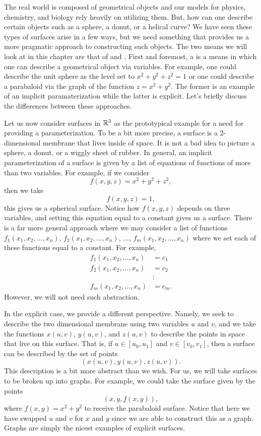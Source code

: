     The real world is composed of geometrical objects and our models for physics, chemistry, and biology rely heavily on utilizing them.  But, how can one describe certain objects such as a sphere, a donut, or a helical curve?  We have seen these types of surfaces arise in a few ways, but we need something that provides us a more pragmatic approach to constructing such objects. The two means we will look at in this chapter are that of  and . First and foremost, a  is a means in which one can describe a geometrical object via variables.  For example, one could describe the unit sphere as the level set to $x^2+y^2+z^2=1$ or one could describe a parabaloid via the graph of the function $z=x^2+y^2$. The former is an example of an implicit paramaterization while the latter is explicit. Let's briefly discuss the differences between these approaches.
    
    Let us now consider surfaces in $\mathbb{R}^3$ as the prototypical example for a need for providing a parameterization.  To be a bit more precise, a surface is a 2-dimensional membrane that lives inside of space.  It is not a bad idea to picture a sphere, a donut, or a wiggly sheet of rubber. In general, an implicit parameterization of a surface is given by a list of equations of functions of more than two variables.  For example, if we consider
    \[
    f(x,y,z) = x^2+y^2+z^2,
    \]
    then we take
    \[
    f(x,y,z) = 1,
    \]
    this gives us a spherical surface.  Notice how $f(x,y,z)$ depends on three variables, and setting this equation equal to a constant gives us a surface.  There is a far more general approach where we may consider a list of functions $f_1(x_1,x_2,\dots,x_n)$, $f_2(x_1,x_2,\dots,x_n)$, $\dots$, $f_m(x_1,x_2,\dots,x_n)$ where we set each of these functions equal to a constant. For example,
    \begin{align*}
        f_1(x_1,x_2,\dots,x_n) &= c_1\\
        f_2(x_1,x_2,\dots,x_n) &= c_2\\
        &\vdots\\
        f_m(x_1,x_2,\dots,x_n) &= c_m.
    \end{align*}
    However, we will not need such abstraction.
    
    In the explicit case, we provide a different perspective.  Namely, we seek to describe the two dimensional membrane using two variables $u$ and $v$, and we take the functions $x(u,v)$, $y(u,v)$, and $z(u,v)$ to describe the points in space that live on this surface.  That is, if $u\in [u_0,u_1]$ and $v\in [v_0,v_1]$, then a surface can be described by the set of points
    \[
    (x(u,v),y(u,v),z(u,v)).
    \]
    This description is a bit more abstract than we wish.  For us, we will take surfaces to be broken up into graphs.  For example, we could take the surface given by the points
    \[
    (x,y,f(x,y)),
    \]
    where $f(x,y)=x^2+y^2$ to receive the parabaloid surface.  Notice that here we have swapped $u$ and $v$ for $x$ and $y$ since we are able to construct this as a graph. Graphs are simply the nicest examples of explicit surfaces.


